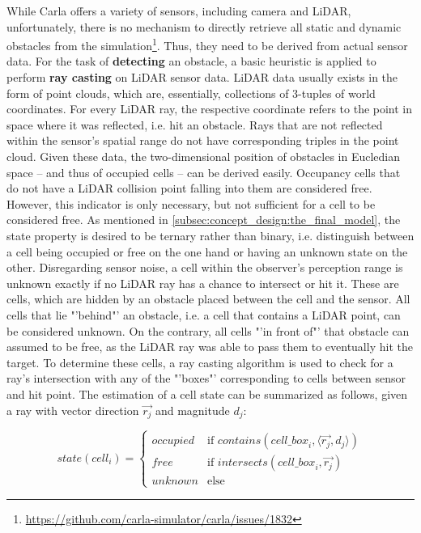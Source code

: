 While Carla offers a variety of sensors, including camera and LiDAR, unfortunately, there is no mechanism to directly retrieve all static and dynamic obstacles from the simulation\footnote{\url{https://github.com/carla-simulator/carla/issues/1832}}. Thus, they need to be derived from actual sensor data. For the task of \textbf{detecting} an obstacle, a basic heuristic is applied to  perform \textbf{ray casting} on LiDAR sensor data. LiDAR data usually exists in the form of point clouds, which are, essentially, collections of 3-tuples of world coordinates. For every LiDAR ray, the respective coordinate refers to the point in space where it was reflected, i.e. hit an obstacle. Rays that are not reflected within the sensor's spatial range do not have corresponding triples in the point cloud. Given these data, the two-dimensional position of obstacles in Eucledian space – and thus of occupied cells – can be derived easily. Occupancy cells that do not have a LiDAR collision point falling into them are considered free. However, this indicator is only necessary, but not sufficient for a cell to be considered free. As mentioned in \cref{subsec:concept_design:the_final_model}, the state property is desired to be ternary rather than binary, i.e. distinguish between a cell being occupied or free on the one hand or having an unknown state on the other. Disregarding sensor noise, a cell within the observer's perception range is unknown exactly if no LiDAR ray has a chance to intersect or hit it. These are cells, which are hidden by an obstacle placed between the cell and the sensor. All cells that lie "'behind"' an obstacle, i.e. a cell that contains a LiDAR point, can be considered unknown. On the contrary, all cells "'in front of"' that obstacle can assumed to be free, as the LiDAR ray was able to pass them to eventually hit the target. To determine these cells, a ray casting algorithm is used to check for a ray's intersection with any of the "'boxes"' corresponding to cells between sensor and hit point. The estimation of a cell state can be summarized as follows, given a ray with vector direction $\vec{r_j}$ and magnitude $d_j$:

$$
\textit{state}(cell_i) = 
\begin{cases}
\textit{occupied} & \text{if\ } \textit{contains}(\textit{cell\_box}_i, \langle \vec{r_j}, d_j \rangle) \\
\textit{free} & \text{if\ } \textit{intersects}(\textit{cell\_box}_i, \vec{r_j}) \\
\textit{unknown} & \text{else}
\end{cases}
$$

